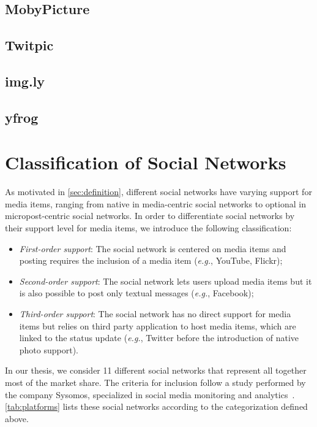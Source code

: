 \subsection{MobyPicture}

\subsection{Twitpic}

\subsection{img.ly}

\subsection{yfrog}

\section{Classification of Social Networks}
As motivated in \autoref{sec:definition}, different social networks have varying support
for media items, ranging from native in media-centric social networks
to optional in micropost-centric social networks.
In order to differentiate social networks by their support level for media items,
we introduce the following classification:

\begin{itemize}
  \item \emph{First-order support}: The social network is centered on media items and posting requires the inclusion of a media item (\emph{e.g.}, YouTube, Flickr);
  \item \emph{Second-order support}: The social network lets users upload media items but it is also possible to post only textual messages (\emph{e.g.}, Facebook);
  \item \emph{Third-order support}: The social network has no direct support for media items but relies on third party application to host media items,
which are linked to the status update (\emph{e.g.}, Twitter before the introduction of native photo support).
\end{itemize}

In our thesis, we consider 11 different social networks that represent all together most of the market share.
The criteria for inclusion follow a study performed by the company Sysomos, specialized in social media monitoring and analytics~\cite{Levine2011}.
\autoref{tab:platforms} lists these social networks according to the categorization defined above.

